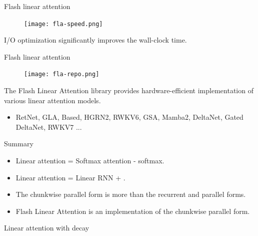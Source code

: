 \begin{frame}{Flash linear attention}
 \begin{figure}
    \centering
    \texttt{[image: fla-speed.png]}
 \end{figure}
 \vspace{2mm} 
   I/O optimization significantly improves the wall-clock time.
\end{frame}

\begin{frame}{Flash linear attention}
    \begin{figure}
        \centering
        \texttt{[image: fla-repo.png]}
    \end{figure}
    The Flash Linear Attention library provides hardware-efficient implementation of various linear attention models.
    \begin{itemize}
        \item RetNet, GLA, Based, HGRN2, RWKV6, GSA, Mamba2, DeltaNet, Gated DeltaNet, RWKV7  ...
    \end{itemize}
\end{frame}

\begin{frame}{Summary}
    \begin{itemize}
        \item Linear attention = Softmax attention - softmax.
        \item Linear attention = Linear RNN + {\color{red}{matrix-valued hidden state}}.
        \item The chunkwise parallel form is more {\color{red}{hardware-friendly}} than the recurrent and parallel forms.
        \item Flash Linear Attention is an {\color{red}{I/O-aware}} implementation of the chunkwise parallel form.
    \end{itemize}
\end{frame}

\begin{frame}{}
    \centering
    \LARGE
     Linear attention with decay
\end{frame} 



